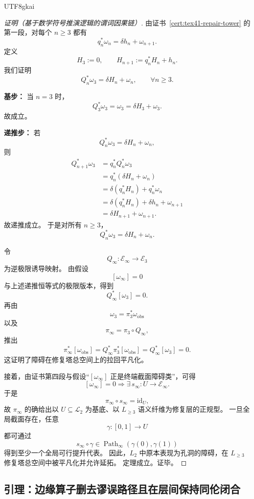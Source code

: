 \documentclass[12pt]{article}
\newcommand{\Ltwo}{\mathcal{L}_2}
\newcommand{\Path}{\operatorname{Path}}
\newcommand{\id}{\mathrm{id}}
\begin{document}
\begin{CJK*}{UTF8}{gkai}
\begin{proof}[证明（基于数学符号推演逻辑的谓词因果链）]
由证书~\ref{cert:tex41-repair-tower} 的第一段，对每个 $n\ge 3$ 都有
\[
  q_n^\ast\omega_n=\delta h_n+\omega_{n+1}.
\]
定义
\[
  H_3:=0,\qquad
  H_{n+1}:=q_n^\ast H_n+h_n.
\]
我们证明
\[
  Q_n^\ast\omega_3=\delta H_n+\omega_n,
  \qquad
  \forall n\ge 3.
\]

\textbf{基步：}
当 $n=3$ 时，
\[
  Q_3^\ast\omega_3=\omega_3=\delta H_3+\omega_3.
\]
故成立。

\textbf{递推步：}
若
\[
  Q_n^\ast\omega_3=\delta H_n+\omega_n,
\]
则
\[
  \begin{aligned}
    Q_{n+1}^\ast\omega_3
    &=q_n^\ast Q_n^\ast\omega_3\\
    &=q_n^\ast(\delta H_n+\omega_n)\\
    &=\delta(q_n^\ast H_n)+q_n^\ast\omega_n\\
    &=\delta(q_n^\ast H_n)+\delta h_n+\omega_{n+1}\\
    &=\delta H_{n+1}+\omega_{n+1}.
  \end{aligned}
\]
故递推成立。
于是对所有 $n\ge 3$，
\[
  Q_n^\ast\omega_3=\delta H_n+\omega_n.
\]

令
\[
  Q_\infty:\mathcal E_\infty\to\mathcal E_3
\]
为逆极限诱导映射。
由假设
\[
  [\omega_\infty]=0
\]
与上述递推恒等式的极限版本，得到
\[
  Q_\infty^\ast[\omega_3]=0.
\]
再由
\[
  \omega_3=\pi_3^\ast\omega_{\mathrm{obs}}
\]
以及
\[
  \pi_\infty=\pi_3\circ Q_\infty,
\]
推出
\[
  \pi_\infty^\ast[\omega_{\mathrm{obs}}]
  =
  Q_\infty^\ast\pi_3^\ast[\omega_{\mathrm{obs}}]
  =
  Q_\infty^\ast[\omega_3]
  =
  0.
\]
这证明了障碍在修复塔总空间上的拉回平凡化。

接着，由证书第四段与假设“$[\omega_\infty]$ 正是终端截面障碍类”，可得
\[
  [\omega_\infty]=0
  \Rightarrow
  \exists\, s_\infty:U\to\mathcal E_\infty.
\]
于是
\[
  \pi_\infty\circ s_\infty=\id_U,
\]
故 $\pi_\infty$ 的确给出以 $U\subseteq \Ltwo$ 为基底、以 $L_{\ge 3}$ 语义纤维为修复层的正规型。
一旦全局截面存在，任意
\[
  \gamma:[0,1]\to U
\]
都可通过
\[
  s_\infty\circ\gamma
  \in
  \Path_\infty(\gamma(0),\gamma(1))
\]
得到至少一个全局可行提升代表。
因此，$L_2$ 中原本表现为孔洞的障碍，在 $L_{\ge 3}$ 修复塔总空间中被平凡化并允许延拓。
定理成立。证毕。
\end{proof}

\subsection{引理：边缘算子删去谬误路径且在层间保持同伦闭合}
\label{subsec:tex41-ch1-lemma}


\end{CJK*}
\end{document}
